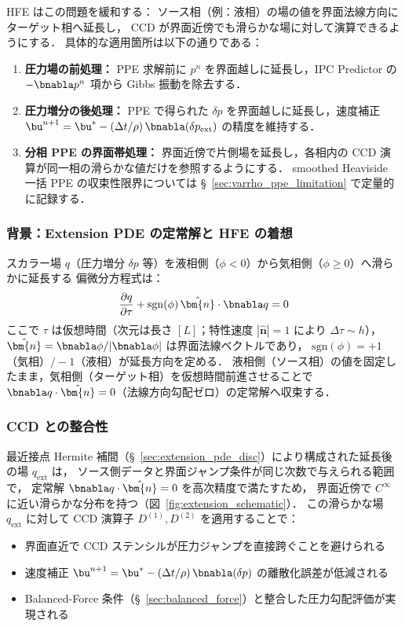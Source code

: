 HFE はこの問題を緩和する：
ソース相（例：液相）の場の値を界面法線方向にターゲット相へ延長し，
CCD が界面近傍でも滑らかな場に対して演算できるようにする．
具体的な適用箇所は以下の通りである：
\begin{enumerate}[noitemsep]
  \item \textbf{圧力場の前処理：}
        PPE 求解前に $p^n$ を界面越しに延長し，IPC Predictor の $-\bnabla p^n$ 項から
        Gibbs 振動を除去する．
  \item \textbf{圧力増分の後処理：}
        PPE で得られた $\delta p$ を界面越しに延長し，速度補正
        $\bu^{n+1} = \bu^* - (\Delta t/\rho)\,\bnabla(\delta p_{\mathrm{ext}})$ の精度を維持する．
  \item \textbf{分相 PPE の界面帯処理：}
        界面近傍で片側場を延長し，各相内の CCD 演算が同一相の滑らかな値だけを参照するようにする．
        smoothed Heaviside 一括 PPE の収束性限界については
        §~\ref{sec:varrho_ppe_limitation} で定量的に記録する．
\end{enumerate}

\subsubsection{背景：Extension PDE の定常解と HFE の着想}

スカラー場 $q$（圧力増分 $\delta p$ 等）を液相側（$\phi < 0$）から気相側（$\phi \ge 0$）へ滑らかに延長する
偏微分方程式は：
\begin{equation}
  \frac{\partial q}{\partial \tau} + \mathrm{sgn}(\phi)\,\hat{\bm{n}}\cdot\bnabla q = 0
  \label{eq:extension_pde_main}
\end{equation}
\label{eq:extension_pde}%
ここで $\tau$ は仮想時間（次元は長さ $[L]$；特性速度 $|\hat{\bm{n}}| = 1$ により $\Delta\tau \sim h$），
$\hat{\bm{n}} = \bnabla\phi/|\bnabla\phi|$ は界面法線ベクトルであり，
$\mathrm{sgn}(\phi) = +1$（気相）$/-1$（液相）が延長方向を定める．
液相側（ソース相）の値を固定したまま，気相側（ターゲット相）を仮想時間前進させることで
$\bnabla q \cdot \hat{\bm{n}} = 0$（法線方向勾配ゼロ）の定常解へ収束する．

\subsubsection{CCD との整合性}

最近接点 Hermite 補間（§~\ref{sec:extension_pde_disc}）により構成された延長後の場 $q_{\mathrm{ext}}$ は，
ソース側データと界面ジャンプ条件が同じ次数で与えられる範囲で，
定常解 $\bnabla q \cdot \hat{\bm{n}} = 0$ を高次精度で満たすため，
界面近傍で $C^\infty$ に近い滑らかな分布を持つ（図~\ref{fig:extension_schematic}）．
この滑らかな場 $q_{\mathrm{ext}}$ に対して CCD 演算子 $D^{(1)}, D^{(2)}$ を適用することで：
\begin{itemize}
  \item 界面直近で CCD ステンシルが圧力ジャンプを直接跨ぐことを避けられる
  \item 速度補正 $\bu^{n+1} = \bu^* - (\Delta t/\rho)\,\bnabla(\delta p)$ の離散化誤差が低減される
  \item Balanced-Force 条件（§~\ref{sec:balanced_force}）と整合した圧力勾配評価が実現される
\end{itemize}

